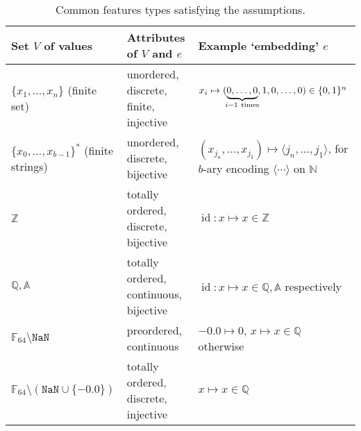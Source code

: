\documentclass[a4paper,parskip=half]{scrartcl}
\newcommand*\id{\operatorname{id}}
\begin{document}
\begin{table}[h]
\centering\small
\def\arraystretch{1.2}
\begin{tabular}{p{8.8em}|p{16em}|p{15.3em}}
Set $V$ of values & Attributes of $V$ and $e$ & Example `embedding' $e$
\\ \hline\hline
$\{x_1,\ldots,x_n\}$ \newline (finite set)
& unordered, discrete, finite, injective
& $x_i\mapsto(\underbrace{0,\ldots,0}_{\mathclap{i-1~\text{times}}},1,0,\ldots,0)\in\{0,1\}^n$
\\ \hline
$\{x_0,\ldots,x_{b-1}\}^*$ \newline (finite strings)
& \raggedright unordered, discrete, bijective
& %
  $(x_{j_n},\ldots,x_{j_1})\mapsto\langle j_n,\ldots,j_1\rangle$, \newline
  for $b$-ary encoding $\langle\cdots\rangle$ on $\mathbb N$
\\ \hline\hline
$\mathbb Z$
& \raggedright totally ordered, discrete, bijective %
& $\id:x\mapsto x\in\mathbb Z$
\\ \hline
$\mathbb Q,\mathbb A$
& \raggedright totally ordered, continuous, bijective %
& $\id:x\mapsto x\in\mathbb Q,\mathbb A$ respectively %
\\ \hline
$\mathbb F_{64}\setminus\mathtt{NaN}$
& \raggedright preordered, continuous %
& $-0.0\mapsto 0$, $x\mapsto x\in\mathbb Q$ otherwise
\\ \hline
$\mathbb F_{64}\setminus(\mathtt{NaN}\cup\{-0.0\})$
& \raggedright totally ordered, discrete, injective %
& $x\mapsto x\in\mathbb Q$
\end{tabular}
\caption{%
	Common features types satisfying the assumptions.
}
\label{tab:features}
\end{table}
\end{document}
